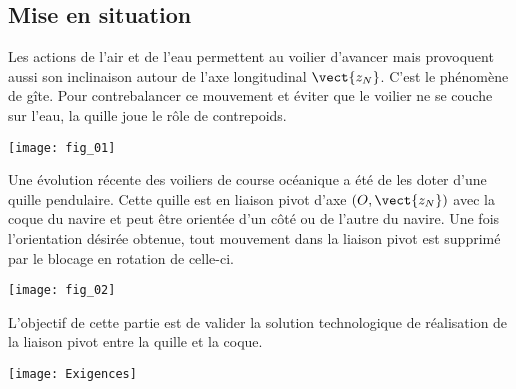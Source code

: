 \setcounter{exo}{0}

\ifprof
\else
\begin{multicols}{2}
\fi

\section*{Mise en situation}
\ifprof
\else

Les actions de l'air et de l'eau permettent au voilier d'avancer mais provoquent aussi son inclinaison autour de l'axe longitudinal $\vect{z_N}$. C’est le phénomène de gîte. Pour contrebalancer ce mouvement et éviter que le voilier ne se couche sur l’eau, la quille joue le rôle de contrepoids. 


\begin{center}
\texttt{[image: fig\_01]}
\end{center}

Une évolution récente des voiliers de course océanique a été de les doter d’une quille pendulaire. Cette quille est en liaison pivot d’axe $\left(O,\vect{z_N} \right)$ avec la coque du navire et peut être orientée d’un côté ou de l’autre du navire. Une fois l’orientation désirée obtenue, tout mouvement dans la liaison pivot est supprimé par le blocage en rotation de celle-ci. 


\begin{center}
\texttt{[image: fig\_02]}
\end{center}
\fi
\begin{obj}
L’objectif de cette partie est de valider la solution technologique de réalisation de la liaison pivot  entre la quille et la coque.
\end{obj}

\ifprof
\else

\begin{center}
\texttt{[image: Exigences]}
\end{center}
\fi

\end{multicols}
